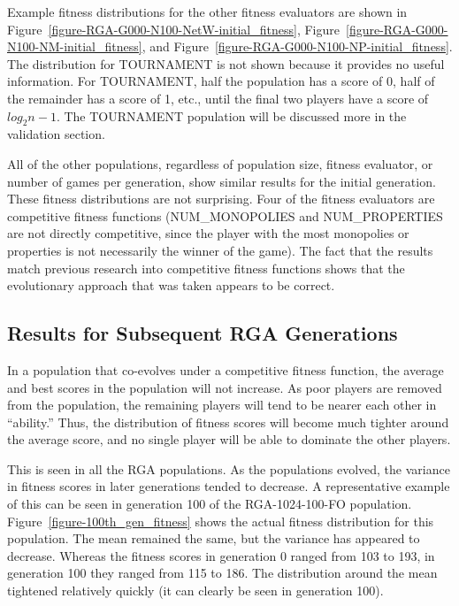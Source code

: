 Example fitness distributions for the other fitness evaluators are shown in
Figure~\ref{figure-RGA-G000-N100-NetW-initial_fitness},
Figure~\ref{figure-RGA-G000-N100-NM-initial_fitness}, and
Figure~\ref{figure-RGA-G000-N100-NP-initial_fitness}. The distribution for
TOURNAMENT is not shown because it provides no useful information. For
TOURNAMENT, half the population has a score of 0, half of the remainder has a
score of 1, etc., until the final two players have a score of \(log_{2} n-1\).
The TOURNAMENT population will be discussed more in the validation section.

All of the other populations, regardless of population size, fitness evaluator,
or number of games per generation, show similar results for the initial
generation. These fitness distributions are not surprising. Four of the fitness
evaluators are competitive fitness functions (NUM\_MONOPOLIES and
NUM\_PROPERTIES are not directly competitive, since the player with the most
monopolies or properties is not necessarily the winner of the game). The fact
that the results match previous research into competitive fitness functions
shows that the evolutionary approach that was taken appears to be correct.

\subsection{Results for Subsequent RGA Generations}

In a population that co-evolves under a competitive fitness function, the
average and best scores in the population will not increase. As poor players are
removed from the population, the remaining players will tend to be nearer each
other in ``ability.'' Thus, the distribution of fitness scores will become much
tighter around the average score, and no single player will be able to dominate
the other players.

This is seen in all the RGA populations. As the populations evolved, the
variance in fitness scores in later generations tended to decrease. A
representative example of this can be seen in generation 100 of the
RGA-1024-100-FO population. Figure~\ref{figure-100th_gen_fitness} shows the
actual fitness distribution for this population. The mean remained the same, but
the variance has appeared to decrease. Whereas the fitness scores in generation
0 ranged from 103 to 193, in generation 100 they ranged from 115 to 186. The
distribution around the mean tightened relatively quickly (it can clearly be
seen in generation 100). 

